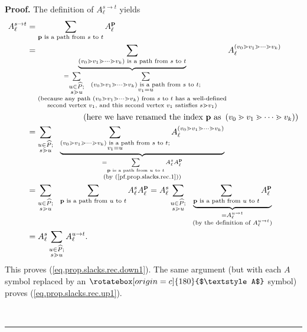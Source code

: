 \documentclass[numbers=enddot,12pt,final,onecolumn,notitlepage]{scrartcl}%
\theoremstyle{definition}
\newenvironment{verlong}{}{}
\newcommand{\upslack}{\mathchoice{\rotatebox[origin=c]{180}{$\displaystyle A$}}{\rotatebox[origin=c]{180}{$\textstyle A$}}{\rotatebox[origin=c]{180}{$\scriptstyle A$}}{\rotatebox[origin=c]{180}{$\scriptscriptstyle A$}}}
\newcommand{\downslack}{A}
\newenvironment{proof}[1][Proof]{\noindent\textbf{#1.} }{\ \rule{0.5em}{0.5em}}
\let\sumnonlimits\sum
\renewcommand{\sum}{\sumnonlimits\limits}
\begin{document}
\begin{verlong}
\begin{proof}
The definition of $\downslack_{\ell}^{s\rightarrow t}$ yields%
\begin{align*}
\downslack_{\ell}^{s\rightarrow t}  &  =\sum_{\mathbf{p}\text{ is a path from
}s\text{ to }t}\downslack_{\ell}^{\mathbf{p}}\\
&  =\underbrace{\sum_{\left(  v_{0}\gtrdot v_{1}\gtrdot\cdots\gtrdot
v_{k}\right)  \text{ is a path from }s\text{ to }t}}_{\substack{=\sum
_{\substack{u\in\widehat{P};\\s\gtrdot u}}\ \ \sum_{\substack{\left(
v_{0}\gtrdot v_{1}\gtrdot\cdots\gtrdot v_{k}\right)  \text{ is a path from
}s\text{ to }t;\\v_{1}=u}}\\\text{(because any path }\left(  v_{0}\gtrdot
v_{1}\gtrdot\cdots\gtrdot v_{k}\right)  \text{ from }s\text{ to }t\text{ has a
well-defined}\\\text{second vertex }v_{1}\text{, and this second vertex }%
v_{1}\text{ satisfies }s\gtrdot v_{1}\text{)}}}\downslack_{\ell}^{\left(
v_{0}\gtrdot v_{1}\gtrdot\cdots\gtrdot v_{k}\right)  }\\
&  \ \ \ \ \ \ \ \ \ \ \ \ \ \ \ \ \ \ \ \ \left(  \text{here we have renamed
the index }\mathbf{p}\text{ as }\left(  v_{0}\gtrdot v_{1}\gtrdot\cdots\gtrdot
v_{k}\right)  \right) \\
&  =\sum_{\substack{u\in\widehat{P};\\s\gtrdot u}}\ \ \underbrace{\sum
_{\substack{\left(  v_{0}\gtrdot v_{1}\gtrdot\cdots\gtrdot v_{k}\right)
\text{ is a path from }s\text{ to }t;\\v_{1}=u}}\downslack_{\ell}^{\left(
v_{0}\gtrdot v_{1}\gtrdot\cdots\gtrdot v_{k}\right)  }}_{\substack{=\sum
_{\mathbf{p}\text{ is a path from }u\text{ to }t}\downslack_{\ell}%
^{s}\downslack_{\ell}^{\mathbf{p}}\\\text{(by (\ref{pf.prop.slacks.rec.1}))}%
}}\\
&  =\sum_{\substack{u\in\widehat{P};\\s\gtrdot u}}\ \ \sum_{\mathbf{p}\text{
is a path from }u\text{ to }t}\downslack_{\ell}^{s}\downslack_{\ell
}^{\mathbf{p}}=\downslack_{\ell}^{s}\sum_{\substack{u\in\widehat{P};\\s\gtrdot
u}}\ \ \underbrace{\sum_{\mathbf{p}\text{ is a path from }u\text{ to }%
t}\downslack_{\ell}^{\mathbf{p}}}_{\substack{=\downslack_{\ell}^{u\rightarrow
t}\\\text{(by the definition of }\downslack_{\ell}^{u\rightarrow t}\text{)}%
}}\\
&  =\downslack_{\ell}^{s}\sum_{\substack{u\in\widehat{P};\\s\gtrdot
u}}\downslack_{\ell}^{u\rightarrow t}.
\end{align*}
This proves (\ref{eq.prop.slacks.rec.down1}). The same argument (but with each
$\downslack$ symbol replaced by an $\upslack$ symbol) proves
(\ref{eq.prop.slacks.rec.up1}).


\end{proof}
\end{verlong}
\end{document}
